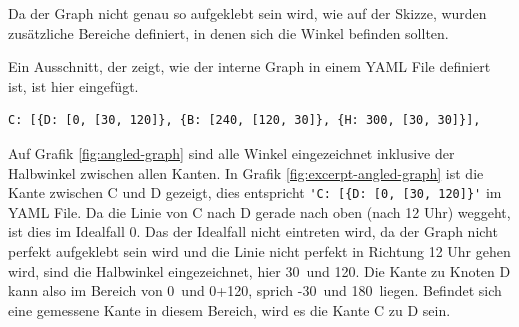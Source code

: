 Da der Graph nicht genau so aufgeklebt sein wird, wie auf der Skizze, wurden zusätzliche Bereiche definiert, in denen sich die Winkel befinden sollten.

Ein Ausschnitt, der zeigt, wie der interne Graph in einem YAML File definiert ist, ist hier eingefügt.

\begin{verbatim}
C: [{D: [0, [30, 120]}, {B: [240, [120, 30]}, {H: 300, [30, 30]}],
\end{verbatim}

Auf Grafik \ref{fig:angled-graph} sind alle Winkel eingezeichnet inklusive der Halbwinkel zwischen allen Kanten. In Grafik \ref{fig:excerpt-angled-graph} ist die Kante zwischen C und D gezeigt, dies entspricht \verb|'C: [{D: [0, [30, 120]}'| im YAML File. Da die Linie von C nach D gerade nach oben (nach 12 Uhr) weggeht, ist dies im Idealfall 0\textdegree.
Das der Idealfall nicht eintreten wird, da der Graph nicht perfekt aufgeklebt sein wird und die Linie nicht perfekt in Richtung 12 Uhr gehen wird, sind die Halbwinkel eingezeichnet, hier 30\textdegree\ und 120\textdegree. Die Kante zu Knoten D kann also im Bereich von 0\textdegree\ und 0\textdegree+120\textdegree, sprich -30\textdegree\ und 180\textdegree\ liegen. Befindet sich eine gemessene Kante in diesem Bereich, wird es die Kante C zu D sein.

